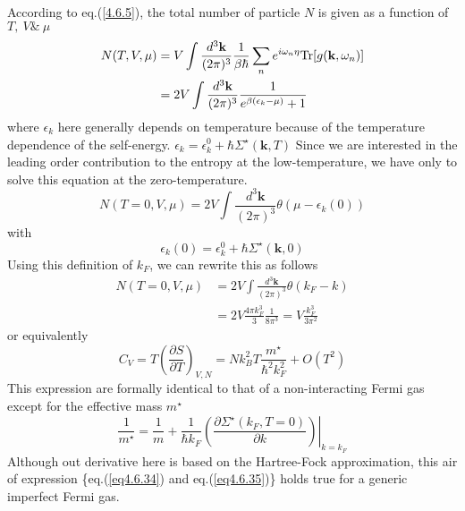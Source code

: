  According to eq.(\ref{4.6.5}), the total number of particle $N$ is given as a function of $T,\ V\&\ \mu$
\[
\begin{aligned}
N(T,V,\mu)&=V\int \frac{d^3\mathbf{k}}{(2\pi)^3} \frac{1}{\beta\hbar} \sum_n e^{i\omega_n \eta} \text{Tr}[g(\mathbf{k},\omega_n)]\\
&=2V\int \frac{d^3\mathbf{k}}{(2\pi)^3}\frac{1}{e^{\beta(\epsilon_k-\mu)}+1}
\end{aligned}
\]
where $\epsilon_k$ here generally depends on temperature because of the temperature dependence of the self-energy. $\epsilon_k=\epsilon_k^0+\hbar \Sigma^\star (\mathbf{k},T)$
 Since we are interested in the leading order contribution to the entropy at the low-temperature, we have only to solve this equation at the zero-temperature.
\begin{equation}
N(T=0,V,\mu)=2V \int \frac{d^3\mathbf{k}}{(2\pi)^3} \theta(\mu-\epsilon_k(0))
\end{equation} 
with
\begin{equation}\tag{4.6.31'}
\epsilon_k(0)=\epsilon_k^0+\hbar \Sigma^\star (\mathbf{k},0)
\end{equation}
 Using this definition of $k_F$, we can rewrite this as follows
\begin{equation}
\begin{aligned}
N(T=0,V,\mu)&=2V \int \frac{d^3\mathbf{k}}{(2\pi)^3} \theta(k_F-k)\\
&=2V\frac{4\pi k_F^3}{3} \frac{1}{8\pi^3}=V\frac{k_F^3}{3\pi^2}
\end{aligned}
\end{equation}
or equivalently
\begin{equation}\label{eq4.6.34}
C_V=T\left(\frac{\partial S}{\partial T}\right)_{V,N}=N k_B^2 T \frac{m^\star}{\hbar^2 k_F^2} +O(T^2)
\end{equation}
 This expression are formally identical to that of a non-interacting Fermi gas except for the effective mass $m^\star$
\begin{equation}\label{eq4.6.35}
\frac{1}{m^\star} =\frac{1}{m} +\frac{1}{\hbar k_F}\left. \left( \frac{\partial \Sigma^\star(k_F,T=0)}{\partial k} \right)\right|_{k=k_F}
\end{equation}
 Although out derivative here is based on the Hartree-Fock approximation, this air of expression \{eq.(\ref{eq4.6.34}) and eq.(\ref{eq4.6.35})\} holds true for a generic imperfect Fermi gas.







